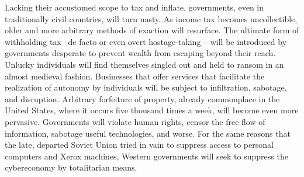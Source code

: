 \begin{paracol}{2}[]
\switchcolumn
Lacking their accustomed scope to tax and inflate, governments, even in traditionally civil countries, will turn nasty. As income tax becomes uncollectible, older and more arbitrary methods of exaction will resurface. The ultimate form of withholding tax --de facto or even overt hostage-taking -- will be introduced by governments desperate to prevent wealth from escaping beyond their reach. Unlucky individuals will find themselves singled out and held to ransom in an almost medieval fashion. Businesses that offer services that facilitate the realization of autonomy by individuals will be subject to infiltration, sabotage, and disruption. Arbitrary forfeiture of property, already commonplace in the United States, where it occurs five thousand times a week, will become even more pervasive. Governments will violate human rights, censor the free flow of information, sabotage useful technologies, and worse. For the same reasons that the late, departed Soviet Union tried in vain to suppress access to personal computers and Xerox machines, Western governments will seek to suppress the cybereconomy by totalitarian means.
\end{paracol}

